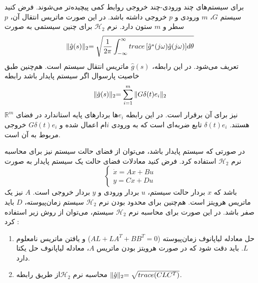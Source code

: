 برای سیستم‌های چند ورودی-چند خروجی روابط کمی پیچیده‌تر می‌شوند. فرض کنید سیستم $G$، $m$ ورودی و $p$ خروجی داشته باشد. در این صورت ماتریس انتقال آن، $p$ سطر و $m$ ستون دارد. نرم $\mathcal{H}_2$ برای چنین سیستمی به صورت
\begin{equation*}
\lVert\hat{g}(s)\lVert_{2}=\sqrt{\dfrac{1}{2\pi}\int_{-\infty}^{\infty}{trace\left[ \hat{g}^{*}(j\omega)\hat{g}(j\omega)\right] }d\theta} 
\end{equation*}
تعریف می‌شود. در این رابطه، $\hat{g}(s)$ ماتریس انتقال سیستم است. هم‌چنین طبق خاصیت پارسوال اگر سیستم پایدار باشد رابطه 
\begin{equation}
\lVert\hat{g}(s)\lVert_{2}=\sum_{i=1}^{m}{\lVert G\delta(t)e_{i}\lVert_{2}} 
\label{eq2-3}
\end{equation}
نیز برای آن برقرار است. در این رابطه $e_{i}$ها بردارهای پایه استاندارد در فضای $\mathbb{R}^{m}$ هستند. $\delta(t)e_{i}$ تابع ضربه‌ای است که به ورودی $i$ام اعمال شده و $G\delta(t)e_{i}$ خروجی مربوط به آن است.

در صورتی که سیستم پایدار باشد، می‌توان از فضای حالت سیستم نیز برای محاسبه نرم $\mathcal{H}_2$ استفاده کرد.  فرض کنید معادلات فضای حالت یک سیستم پایدار به صورت 
\begin{equation*}
\left\{\begin{array}{l}
\dot{x}=Ax +Bu\\
y =Cx+Du 
\end{array}\right. 
\end{equation*}
باشد که $x$ بردار حالت سیستم، $u$ بردار ورودی و $y$ بردار خروجی است. $A$ نیز یک ماتریس هرویتز است. هم‌چنین برای محدود بودن نرم $\mathcal{H}_2$ سیستم زمان‌پیوسته، $D$ باید صفر باشد. در این صورت برای محاسبه نرم $\mathcal{H}_2$ سیستم، می‌توان از روش زیر استفاده کرد \cite{book_1}: 
\begin{enumerate}
\item
حل معادله لیاپانوف زمان‌پیوسته ($AL+LA^{T}+BB^{T}=0$) و یافتن ماتریس نامعلوم $L$.
\newline
باید دقت شود که در صورت هرویتز بودن ماتریس $A$، معادله لیاپانوف حل یکتا دارد.
\item
محاسبه نرم  $\mathcal{H}_2$از طریق رابطه $\lVert\hat{g}\lVert_{2}=\sqrt{trace(CLC^{T})}$.
\cite{ref3}
\end{enumerate}
